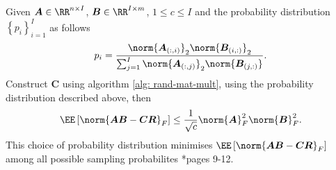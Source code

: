 \begin{lem} \label{lem: col-pro-bounds-gen}
    Given $\bm{A} \in \RR^{n \times I}$, $\bm{B} \in \RR^{I \times m}$, $1 \leq c \leq I$ and the probability distribution $\left\{ p_i \right\}_{i=1}^{I}$ as follows
    \[
        p_i = \frac{\norm{\bm{A}_{(:,i)}}_2 \norm{\bm{B}_{(i,:)}}_2}{\sum_{j=1}^{I} \norm{\bm{A}_{(:,j)}}_2 \norm{\bm{B}_{(j,:)}}}.
    \]
    Construct $\bm{C}$ using algorithm \ref{alg: rand-mat-mult}, using the probability distribution described above, then
    \[
        \EE \left[ \norm{\bm{A} \bm{B} - \bm{C} \bm{R}}_{F} \right] \leq \frac{1}{\sqrt{c}} \norm{\bm{A}}^2_{F} \norm{\bm{B}}^2_{F}.
    \]
    This choice of probability distribution minimises $\EE \left[ \norm{\bm{A} \bm{B} - \bm{C} \bm{R}}_{F} \right]$ among all possible sampling probabilites \cite{doi:10.1137/S0097539704442684}*{pages 9-12}.
\end{lem}

